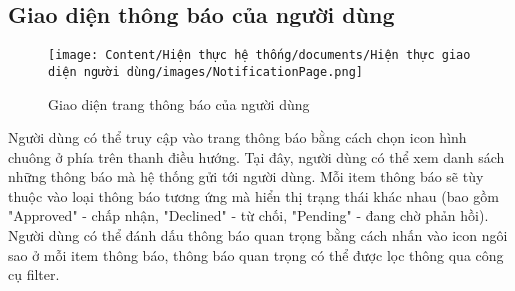 \subsection{Giao diện thông báo của người dùng}

\begin{figure}[H]
    \centering
    \texttt{[image: Content/Hiện thực hệ thống/documents/Hiện thực giao diện người dùng/images/NotificationPage.png]}
    \vspace{0.5cm}
    \caption{Giao diện trang thông báo của người dùng}
    \label{fig: Giao diện trang thông báo của người dùng}
\end{figure}

Người dùng có thể truy cập vào trang thông báo bằng cách chọn icon hình chuông ở phía trên thanh điều hướng. Tại đây, người dùng có thể xem danh sách những thông báo mà hệ thống gửi tới người dùng. Mỗi item thông báo sẽ tùy thuộc vào loại thông báo tương ứng mà hiển thị trạng thái khác nhau (bao gồm "Approved" - chấp nhận, "Declined" - từ chối, "Pending" - đang chờ phản hồi). Người dùng có thể đánh dấu thông báo quan trọng bằng cách nhấn vào icon ngôi sao ở mỗi item thông báo, thông báo quan trọng có thể được lọc thông qua công cụ filter.